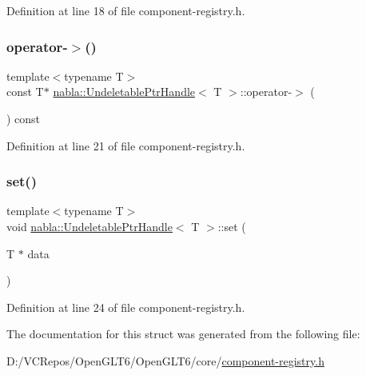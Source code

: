 Definition at line 18 of file component-\/registry.\+h.

\mbox{\label{structnabla_1_1_undeletable_ptr_handle_a6254f505504dd4ee4d560305988e124c}} 
\subsubsection{\texorpdfstring{operator-\/$>$()}{operator->()}\hspace{0.1cm}{\footnotesize\ttfamily [2/2]}}
{\footnotesize\ttfamily template$<$typename T$>$ \\
const T$\ast$ \mbox{\hyperlink{structnabla_1_1_undeletable_ptr_handle}{nabla\+::\+Undeletable\+Ptr\+Handle}}$<$ T $>$\+::operator-\/$>$ (\begin{DoxyParamCaption}{ }\end{DoxyParamCaption}) const\hspace{0.3cm}{\ttfamily [inline]}}



Definition at line 21 of file component-\/registry.\+h.

\mbox{\label{structnabla_1_1_undeletable_ptr_handle_abcc6e0af30f6f48f38a7319c5e282331}} 
\subsubsection{\texorpdfstring{set()}{set()}}
{\footnotesize\ttfamily template$<$typename T$>$ \\
void \mbox{\hyperlink{structnabla_1_1_undeletable_ptr_handle}{nabla\+::\+Undeletable\+Ptr\+Handle}}$<$ T $>$\+::set (\begin{DoxyParamCaption}\item[{T $\ast$}]{data }\end{DoxyParamCaption})\hspace{0.3cm}{\ttfamily [inline]}}



Definition at line 24 of file component-\/registry.\+h.



The documentation for this struct was generated from the following file\+:\begin{DoxyCompactItemize}
\item 
D\+:/\+V\+C\+Repos/\+Open\+G\+L\+T6/\+Open\+G\+L\+T6/core/\mbox{\hyperlink{component-registry_8h}{component-\/registry.\+h}}\end{DoxyCompactItemize}
